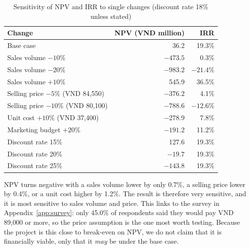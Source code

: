 \begin{table}[ht]
\centering\small
\caption{Sensitivity of NPV and IRR to single changes (discount rate 18\% unless stated)}\label{tab:sens}
\begin{tabular}{@{}L{6.4cm}rr@{}}
  \toprule
  \textbf{Change} & \textbf{NPV (VND million)} & \textbf{IRR}\\
  \midrule
  Base case & 36.2 & 19.3\%\\
  \addlinespace
  Sales volume $-10\%$ & $-473.5$ & 0.3\%\\
  Sales volume $-20\%$ & $-983.2$ & $-21.4\%$\\
  Sales volume $+10\%$ & 545.9 & 36.5\%\\
  \addlinespace
  Selling price $-5\%$ (VND 84,550) & $-376.2$ & 4.1\%\\
  Selling price $-10\%$ (VND 80,100) & $-788.6$ & $-12.6\%$\\
  \addlinespace
  Unit cost $+10\%$ (VND 37,400) & $-278.9$ & 7.8\%\\
  Marketing budget $+20\%$ & $-191.2$ & 11.2\%\\
  \addlinespace
  Discount rate 15\% & 127.6 & 19.3\%\\
  Discount rate 20\% & $-19.7$ & 19.3\%\\
  Discount rate 25\% & $-143.8$ & 19.3\%\\
  \bottomrule
\end{tabular}
\end{table}

NPV turns negative with a sales volume lower by only 0.7\%, a selling price lower by 0.4\%, or a unit
cost higher by 1.2\%. The result is therefore very sensitive, and it is most sensitive to sales volume
and price. This links to the survey in Appendix~\ref{app:survey}: only 45.0\% of respondents said they
would pay VND 89,000 or more, so the price assumption is the one most worth testing. Because the project
is this close to break-even on NPV, we do not claim that it is financially viable, only that it
\emph{may} be under the base case.

